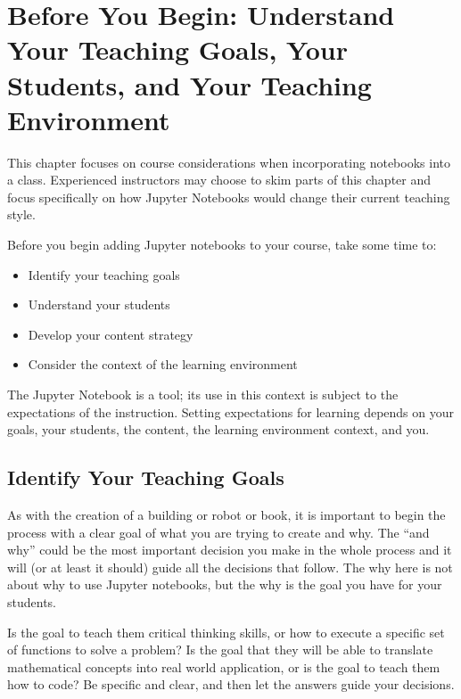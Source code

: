 \documentclass[]{book}
\providecommand{\tightlist}{%
  \setlength{\itemsep}{0pt}\setlength{\parskip}{0pt}}
\begin{document}
\section{Before You Begin: Understand Your Teaching Goals, Your
Students, and Your Teaching
Environment}\label{before-you-begin-understand-your-teaching-goals-your-students-and-your-teaching-environment}

This chapter focuses on course considerations when incorporating
notebooks into a class. Experienced instructors may choose to skim parts
of this chapter and focus specifically on how Jupyter Notebooks would
change their current teaching style.

Before you begin adding Jupyter notebooks to your course, take some time
to:

\begin{itemize}
\tightlist
\item
  Identify your teaching goals
\item
  Understand your students
\item
  Develop your content strategy
\item
  Consider the context of the learning environment
\end{itemize}

The Jupyter Notebook is a tool; its use in this context is subject to
the expectations of the instruction. Setting expectations for learning
depends on your goals, your students, the content, the learning
environment context, and you.

\subsection{Identify Your Teaching
Goals}\label{identify-your-teaching-goals}

As with the creation of a building or robot or book, it is important to
begin the process with a clear goal of what you are trying to create and
why. The ``and why'' could be the most important decision you make in
the whole process and it will (or at least it should) guide all the
decisions that follow. The why here is not about why to use Jupyter
notebooks, but the why is the goal you have for your students.

Is the goal to teach them critical thinking skills, or how to execute a
specific set of functions to solve a problem? Is the goal that they will
be able to translate mathematical concepts into real world application,
or is the goal to teach them how to code? Be specific and clear, and
then let the answers guide your decisions.
\end{document}

